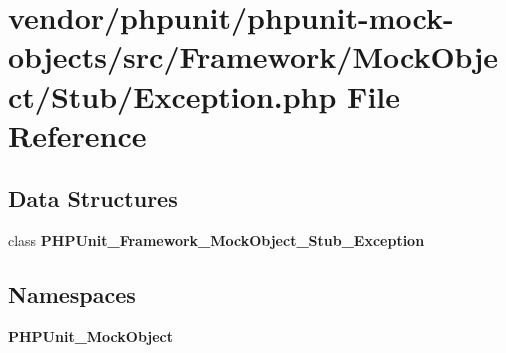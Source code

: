\section{vendor/phpunit/phpunit-\/mock-\/objects/src/\+Framework/\+Mock\+Object/\+Stub/\+Exception.php File Reference}
\label{phpunit_2phpunit-mock-objects_2src_2_framework_2_mock_object_2_stub_2_exception_8php}
\subsection*{Data Structures}
\begin{DoxyCompactItemize}
\item 
class {\bf P\+H\+P\+Unit\+\_\+\+Framework\+\_\+\+Mock\+Object\+\_\+\+Stub\+\_\+\+Exception}
\end{DoxyCompactItemize}
\subsection*{Namespaces}
\begin{DoxyCompactItemize}
\item 
 {\bf P\+H\+P\+Unit\+\_\+\+Mock\+Object}
\end{DoxyCompactItemize}
